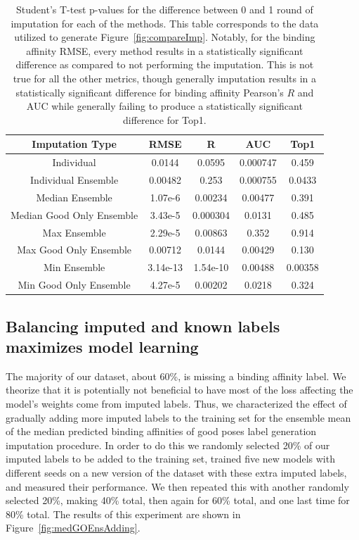 \documentclass[journal=jmcmar,manuscript=article]{achemso}
\begin{document}
\begin{table}
    \centering
    \begin{tabular}{c|c|c|c|c}
    Imputation Type & RMSE & R & AUC & Top1 \\
    \hline
    Individual & 0.0144 & 0.0595 & 0.000747 & 0.459 \\
    Individual  Ensemble & 0.00482 & 0.253 & 0.000755 & 0.0433 \\
    Median Ensemble & 1.07e-6 & 0.00234 & 0.00477 & 0.391 \\
    Median Good Only Ensemble & 3.43e-5 & 0.000304 & 0.0131 & 0.485 \\
    Max Ensemble & 2.29e-5 & 0.00863 & 0.352 & 0.914 \\
    Max Good Only Ensemble & 0.00712 & 0.0144 & 0.00429 & 0.130 \\
    Min Ensemble & 3.14e-13 & 1.54e-10 & 0.00488 & 0.00358 \\
    Min Good Only Ensemble & 4.27e-5 & 0.00202 & 0.0218 & 0.324 \\
    \end{tabular}
    \caption{Student's T-test p-values for the difference between 0 and 1 round of imputation for each of the methods. This table corresponds to the data utilized to generate Figure~\ref{fig:compareImp}. Notably, for the binding affinity RMSE, every method results in a statistically significant difference as compared to not performing the imputation. This is not true for all the other metrics, though generally imputation results in a statistically significant difference for binding affinity Pearson's $R$ and AUC while generally failing to produce a statistically significant difference for Top1.}
    \label{tab:ImpTypeSignificance}
\end{table}

\subsection{Balancing imputed and known labels maximizes model learning}
The majority of our dataset, about 60\%, is missing a binding affinity label.
We theorize that it is potentially not beneficial to have most of the loss affecting the model's weights come from imputed labels.
Thus, we characterized the effect of gradually adding more imputed labels to the training set for the ensemble mean of the median predicted binding affinities of good poses label generation imputation procedure.
In order to do this we randomly selected 20\% of our imputed labels to be added to the training set, trained five new models with different seeds on a new version of the dataset with these extra imputed labels, and measured their performance.
We then repeated this with another randomly selected 20\%, making 40\% total, then again for 60\% total, and one last time for 80\% total.
The results of this experiment are shown in Figure~\ref{fig:medGOEnsAdding}.
\end{document}
